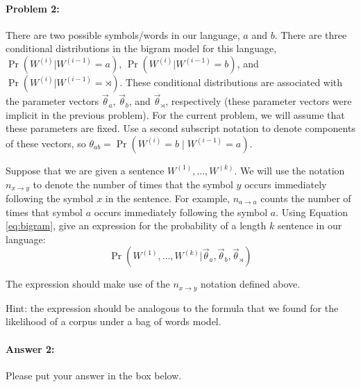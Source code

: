 \documentclass[10pt]{article}
\begin{document}
\hrulefill %

\paragraph{Problem 2:}

There are two possible symbols/words in our language, $a$ and $b$. There are
three conditional distributions in the bigram model for this language, 
$\Pr(W^{(i)} | W^{(i-1)}=a)$, $\Pr(W^{(i)} | W^{(i-1)}=b)$, and
$\Pr(W^{(i)} | W^{(i-1)}=\rtimes)$. 
These conditional distributions are associated with the
parameter vectors $\vec{\theta}_{a}$, $\vec{\theta}_{b}$, and
$\vec{\theta}_{\rtimes}$, respectively (these parameter vectors were implicit in the
previous problem). For the current problem, we will assume that these
parameters are fixed. Use a second subscript notation to denote components of
these vectors, so $\theta_{ab}= \Pr(W^{(i)}=b\mid W^{(i-1)}=a)$.

 Suppose that we are given a sentence $W^{(1)},\dots,W^{(k)}$. We will
use the notation $n_{x \rightarrow y}$ to denote the number of times
that the symbol $y$ occurs immediately following the symbol $x$ in the
sentence. For example, $n_{a \rightarrow a}$ counts the number of
times that symbol $a$ occurs immediately following the symbol $a$.
Using Equation \ref{eq:bigram}, give an expression for the probability
of a length $k$ sentence in our language:
\begin{equation*}
\Pr(W^{(1)},\dots,W^{(k)} | \vec{\theta}_{a}, \vec{\theta}_{b}, \vec{\theta}_{\rtimes})
\end{equation*}

 The expression should make use of the $n_{x \rightarrow y}$ notation
defined above.

 Hint: the expression should be analogous to the formula that we found
for the likelihood of a corpus under a bag of words model.

\paragraph{Answer 2:} Please put your answer in the box below.
\end{document}
